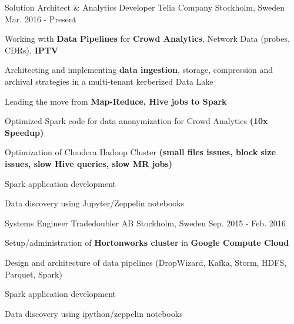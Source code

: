 


\begin{cventries}


\cventry
{Solution Architect \& Analytics Developer} %
{Telia Company} %
{Stockholm, Sweden} %
{Mar. 2016 - Present} %
{ %
\begin{cvitems}
\item Working with \textbf{Data Pipelines} for \textbf{Crowd Analytics}, Network Data (probes, CDRs), \textbf{IPTV} 
\item Architecting and implementing \textbf{data ingestion}, storage, compression and archival strategies in a multi-tenant kerberized Data Lake
\item Leading the move from \textbf{Map-Reduce, Hive jobs to Spark}
\item Optimized Spark code for data anonymization for Crowd Analytics \textbf{(10x Speedup)}
\item Optimization of Cloudera Hadoop Cluster \textbf{(small files issues, block size issues, slow Hive queries, slow MR jobs)}
\item Spark application development
\item Data discovery using Jupyter/Zeppelin notebooks
\end{cvitems}
}


\cventry
{Systems Engineer} %
{Tradedoubler AB} %
{Stockholm, Sweden} %
{Sep. 2015 - Feb. 2016} %
{ %
\begin{cvitems}
\item Setup/administration of \textbf{Hortonworks cluster} in \textbf{Google Compute Cloud}
\item Design and architecture of data pipelines (DropWizard, Kafka, Storm, HDFS, Parquet, Spark)
\item Spark application development
\item Data discovery using ipython/zeppelin notebooks
\end{cvitems}
}


\end{cventries}
